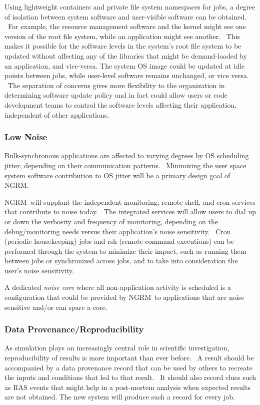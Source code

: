 \documentclass{article}
\newcommand{\ngrm}{NGRM}
\begin{document}
Using lightweight containers and private file system namespaces for jobs,
a degree of isolation between system software and user-visible software
can be obtained.  For example, the resource management software and the
kernel might see one version of the root file system, while an application
might see another.  This makes it possible for the software levels in
the system’s root file system to be updated without affecting any of the
libraries that might be demand-loaded by an application, and vice-versa.
The system OS image could be updated at idle points between jobs, while
user-level software remains unchanged, or vice versa.  The separation of
concerns gives more flexibility to the organization in determining software
update policy and in fact could allow users or code development teams to
control the software levels affecting their application, independent of
other applications.

\subsubsection{Low Noise}

Bulk-synchronous applications are affected to varying degrees by OS
scheduling jitter, depending on their communication patterns.  Minimizing
the user space system software contribution to OS jitter will be a primary
design goal of \ngrm.

\ngrm\ will supplant the independent monitoring, remote shell, and cron
services that contribute to noise today.  The integrated services will
allow users to dial up or down the verbosity and frequency of monitoring,
depending on the debug/monitoring needs versus their application’s noise
sensitivity.  Cron (periodic housekeeping) jobs and rsh (remote command
executions) can be performed through the system to minimize their impact,
such as running them between jobs or synchronized across jobs, and to
take into consideration the user’s noise sensitivity.

A dedicated {\em noise core} where all non-application activity is
scheduled is a configuration that could be provided by \ngrm\ to
applications that are noise sensitive and/or can spare a core.

\subsubsection{Data Provenance/Reproducibility}

As simulation plays an increasingly central role in scientific
investigation, reproducibility of results is more important than ever
before.  A result should be accompanied by a data provenance record that
can be used by others to recreate the inputs and conditions that led to
that result.  It should also record clues such as RAS events that might
help in a post-mortem analysis when expected results are not obtained.
The new system will produce such a record for every job.
\end{document}
